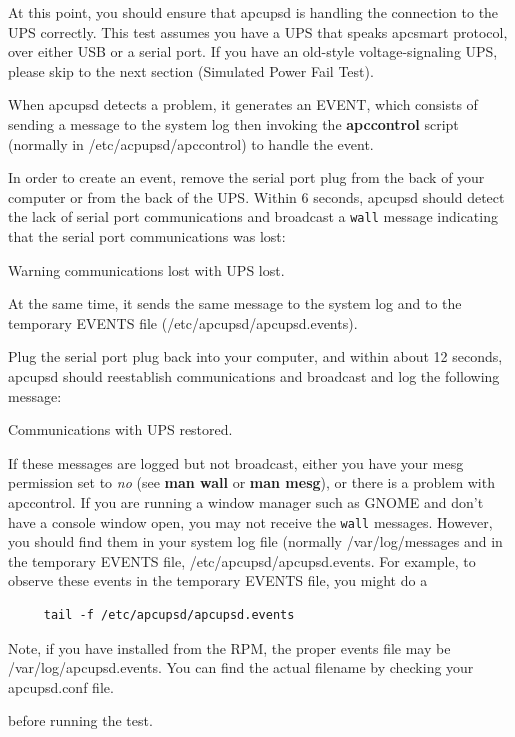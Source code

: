 {{\label{index-Testing_002c-Communications-91}
\label{index-Communications-Testing-92}
At this point, you should ensure that apcupsd is handling the connection to
the UPS correctly. This test assumes you have a UPS that speaks apcsmart
protocol, over either USB or a serial port.  If you have an old-style
voltage-signaling UPS, please skip to the next section (Simulated Power Fail
Test).  

When apcupsd detects a problem, it generates an EVENT, which consists of
sending a message to the system log then invoking the {\bf apccontrol} script
(normally in /etc/acpupsd/apccontrol) to handle the event.  

In order to create an event, remove the serial port plug from the back of your
computer or from the back of the UPS. Within 6 seconds, apcupsd should detect
the lack of serial port communications and broadcast a {\tt wall} message
indicating that the serial port communications was lost:  

Warning communications lost with UPS lost.  

At the same time, it sends the same message to the system log and to the
temporary EVENTS file (/etc/apcupsd/apcupsd.events).  

Plug the serial port plug back into your computer, and within about 12
seconds, apcupsd should reestablish communications and broadcast and log the
following message:  

Communications with UPS restored.  

If these messages are logged but not broadcast, either you have your mesg
permission set to {\it no} (see {\bf man wall} or {\bf man mesg}), or there is
a problem with apccontrol. If you are running a window manager such as GNOME
and don't have a console window open, you may not receive the {\tt wall}
messages. However, you should find them in your system log file (normally
/var/log/messages and in the temporary EVENTS file,
/etc/apcupsd/apcupsd.events. For example, to observe these events in the
temporary EVENTS file, you might do a 

\footnotesize
\begin{verbatim}
     tail -f /etc/apcupsd/apcupsd.events
\end{verbatim}
\normalsize

Note, if you have installed from the RPM, the proper events file may be
/var/log/apcupsd.events. You can find the actual filename by checking your
apcupsd.conf file.  

before running the test.  

}}

